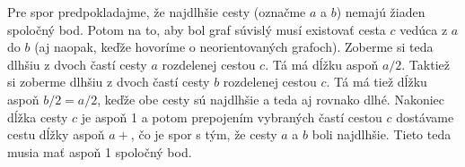 
Pre spor predpokladajme, že najdlhšie cesty (označme $a$ a $b$) nemajú 
žiaden spoločný bod. Potom na to, aby bol graf súvislý musí existovať 
cesta $c$ vedúca z $a$ do $b$ (aj naopak, keďže hovoríme 
o neorientovaných grafoch). Zoberme si teda dlhšiu z dvoch častí cesty 
$a$ rozdelenej cestou $c$. Tá má dĺžku aspoň $a/2$. Taktiež si zoberme 
dlhšiu z dvoch častí cesty $b$ rozdelenej cestou $c$. Tá má tiež dĺžku 
aspoň $b/2=a/2$, keďže obe cesty sú najdlhšie a teda aj rovnako dlhé. 
Nakoniec dĺžka cesty $c$ je aspoň 1 a potom prepojením vybraných častí 
cestou $c$ dostávame cestu dĺžky aspoň $a+$, čo je spor s tým, že cesty 
$a$ a $b$ boli najdlhšie. Tieto teda musia mať aspoň 1 spoločný bod.

